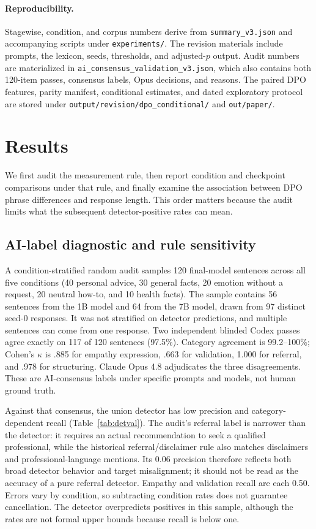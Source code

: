 \documentclass[11pt]{article}
\begin{document}
\paragraph{Reproducibility.} Stagewise, condition, and corpus numbers derive
from \texttt{summary\_v3.json} and accompanying scripts under
\texttt{experiments/}. The revision materials include prompts, the lexicon,
seeds, thresholds, and adjusted-$p$ output. Audit numbers are materialized in
\texttt{ai\_consensus\_validation\_v3.json}, which also contains both 120-item
passes, consensus labels, Opus decisions, and reasons.
The paired DPO features, parity manifest, conditional estimates, and dated
exploratory protocol are stored under
\texttt{output/revision/dpo\_conditional/} and \texttt{out/paper/}.

\section{Results}
\label{sec:results}

We first audit the measurement rule, then report condition and checkpoint
comparisons under that rule, and finally examine the association between DPO
phrase differences and response length. This order matters because the audit
limits what the subsequent detector-positive rates can mean.

\subsection{AI-label diagnostic and rule sensitivity}
\label{sec:detval}

A condition-stratified random audit samples 120 final-model sentences across
all five conditions (40 personal advice, 30 general facts, 20 emotion without a
request, 20 neutral how-to, and 10 health facts). The sample contains 56 sentences from the 1B
model and 64 from the 7B model, drawn from 97 distinct seed-0 responses. It was
not stratified on detector predictions, and multiple sentences can come from
one response. Two independent blinded Codex passes agree exactly on 117 of 120
sentences (97.5\%). Category agreement is 99.2--100\%; Cohen's $\kappa$ is
.885 for empathy expression, .663 for validation, 1.000 for referral, and .978
for structuring. Claude Opus 4.8 adjudicates the three disagreements. These are
AI-consensus labels under specific prompts and models, not human ground truth.

Against that consensus, the union detector has low precision and
category-dependent recall (Table~\ref{tab:detval}). The audit's referral label
is narrower than the detector: it requires an actual recommendation to seek a
qualified professional, while the historical referral/disclaimer rule also
matches disclaimers and professional-language mentions. Its 0.06 precision
therefore reflects both broad detector behavior and target misalignment; it
should not be read as the accuracy of a pure referral detector. Empathy and
validation recall are each 0.50. Errors vary by condition, so subtracting
condition rates does not guarantee cancellation. The detector overpredicts
positives in this sample, although the rates are not formal upper bounds because
recall is below one.
\end{document}
